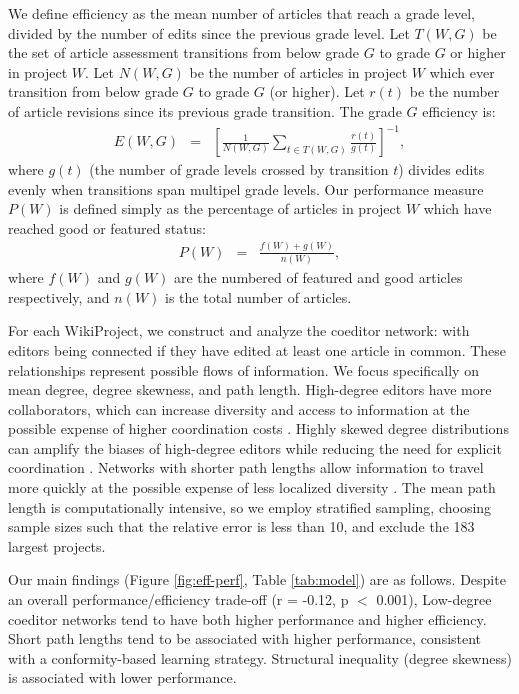 \documentclass[a4paper,12pt]{article}
\newcommand{\+}{\phantom{-}}
\begin{document}
We define efficiency as the mean number of articles that reach a grade level,
divided by the number of edits since the previous grade level.
Let $T(W,G)$ be the set of article assessment transitions from below grade $G$
to grade $G$ or higher in project $W$.
Let $N(W,G)$ be the number of articles in project $W$ which ever transition
from below grade $G$ to grade $G$ (or higher).
Let $r(t)$ be the number of article revisions since its previous grade transition.
The grade $G$ efficiency is:
\begin{eqnarray}
E(W,G)
&=&
\left[
\frac{1}{
N(W,G)
}
\sum_{t \in T(W,G)} \frac{r(t)}{g(t)}
\right]^{-1},
\end{eqnarray}
where $g(t)$ (the number of grade levels crossed by transition $t$)
divides edits evenly when transitions span multipel grade levels.
Our performance measure $P(W)$ is defined simply as
the percentage of articles in project $W$ which have reached
good or featured status:
\begin{eqnarray}
P(W) &=& \frac{f(W) + g(W)}{n(W)},
\end{eqnarray}
where $f(W)$ and $g(W)$ are the numbered of featured and good articles respectively,
and $n(W)$ is the total number of articles.


For each WikiProject, we construct and analyze the coeditor network:
with editors being connected if they have edited at least one article in common.
These relationships represent possible flows of information.
We focus specifically on mean degree, degree skewness, and path length.
High-degree editors have more collaborators,
which can increase diversity and access to information at the possible
expense of higher coordination costs
\cite{hong_groups_2004,golub_naive_2010}.
Highly skewed degree distributions can amplify the biases of high-degree
editors while reducing the need for explicit coordination
\cite{kearns_experiments_2012}.
Networks with shorter path lengths allow information to travel more quickly
at the possible expense of less localized diversity
\cite{mason_propagation_2008,barkoczi_social_2016}.
The mean path length is computationally intensive,
so we employ stratified sampling,
choosing sample sizes such that the relative error is less than 10,
and exclude the 183 largest projects.

Our main findings (Figure \ref{fig:eff-perf}, Table \ref{tab:model}) are as follows.
Despite an overall performance/efficiency trade-off (r = -0.12, p $<$ 0.001),
Low-degree coeditor networks tend to have both higher performance and higher efficiency.
Short path lengths tend to be associated with higher performance, consistent with a conformity-based learning strategy.
Structural inequality (degree skewness) is associated with lower performance.
\end{document}
